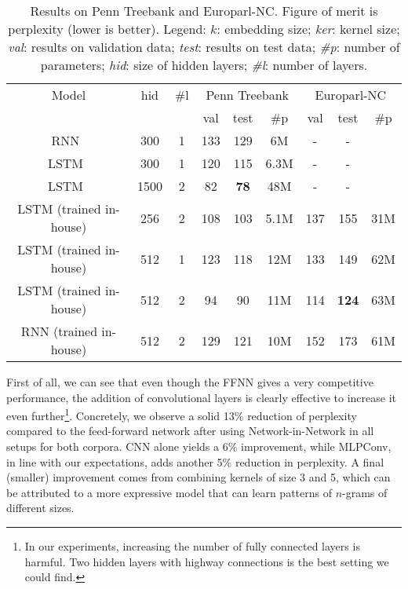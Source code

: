\begin{table*}[t]
\begin{tabular}{|c|c|c|c|c|c|c|c|c|}
		
		\hline
		Model & hid & \#l & \multicolumn{3}{c|}{Penn Treebank} & \multicolumn{3}{c|}{Europarl-NC} \\
		& & &  val & test & \#p & val & test & \#p \\
		\hline 
		RNN~\cite{mikolov2014learning}     & 300  & 1 & 133 & 129  & 6M & - & - & \\
		LSTM~\cite{mikolov2014learning}    & 300  & 1 & 120 & 115  & 6.3M  & - & - & \\
		LSTM~\cite{zaremba2014recurrent}   & 1500 & 2 & 82  & \textbf{78} & 48M  & - & - & \\
		LSTM (trained in-house)            & 256  & 2 & 108 & 103  & 5.1M & 137 & 155 & 31M \\
		LSTM (trained in-house)            & 512  & 1 & 123 & 118  & 12M & 133 & 149 & 62M\\
		LSTM (trained in-house)            & 512  & 2 & 94  & 90   & 11M & 114 & \textbf{124}& 63M\\
		RNN  (trained in-house)            & 512  & 2 & 129 & 121  & 10M & 152 & 173 & 61M\\
		\hline
	\end{tabular}
	\caption{Results on Penn Treebank and Europarl-NC. Figure of merit is
		perplexity (lower is better). Legend: $k$: embedding size;
		\textit{ker}: kernel size; \textit{val}: results on validation
		data; \textit{test}: results on test data; \textit{\#p}: number of
		parameters; \textit{hid}: size of hidden layers; \textit{\#l}:
		number of layers.}
	\label{tab:result}
\end{table*}
%
First of all, we can see that even though the FFNN gives a very competitive performance, the addition of convolutional layers is clearly effective to increase it even further\footnote{In our experiments, increasing the number of fully connected layers is harmful. Two hidden layers with highway connections is the best setting we could find.}. 
Concretely, we observe a solid 13\% reduction of perplexity compared to the feed-forward network after using Network-in-Network in all setups for both corpora.  CNN alone yields a 6\% improvement, while MLPConv, in line with our expectations, adds another 5\% reduction in perplexity. A final (smaller) improvement comes from combining kernels of size 3 and 5, which can be attributed to a more expressive model that can learn patterns of $n$-grams of different sizes.%
